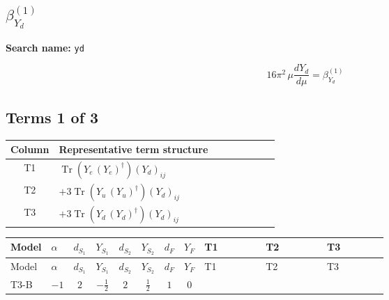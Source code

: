 \documentclass[8pt]{article}
\begin{document}
\begin{landscape}
\section*{$\beta_{Y_d}^{(1)}$}
\noindent\textbf{Search name: }\texttt{yd}\par\smallskip
\[16\pi^2\,\mu\frac{d Y_d}{d\mu}=\beta_{Y_d}^{(1)}\]
\subsection*{Terms 1 of 3}
\begin{center}
\begin{tabular}{@{}c >{\raggedright\arraybackslash}p{0.82\linewidth}@{}}
\toprule
Column & Representative term structure \\
\midrule
T1 & \(\displaystyle \operatorname{Tr}\!\left({Y_e}\,\left({Y_e}\right)^{\dagger}\right) \left({Y_d}\right)_{ij}\) \\
\midrule
T2 & \(\displaystyle +3 \operatorname{Tr}\!\left({Y_u}\,\left({Y_u}\right)^{\dagger}\right) \left({Y_d}\right)_{ij}\) \\
\midrule
T3 & \(\displaystyle +3 \operatorname{Tr}\!\left({Y_d}\,\left({Y_d}\right)^{\dagger}\right) \left({Y_d}\right)_{ij}\) \\
\midrule
\bottomrule
\end{tabular}
\end{center}
\smallskip
\tiny
\begin{longtable}{@{}llcccccc >{\raggedright\arraybackslash}p{0.21\linewidth} >{\raggedright\arraybackslash}p{0.21\linewidth} >{\raggedright\arraybackslash}p{0.21\linewidth}@{}}
\toprule
Model & $\alpha$ & $d_{S_1}$ & $Y_{S_1}$ & $d_{S_2}$ & $Y_{S_2}$ & $d_F$ & $Y_F$ & T1 & T2 & T3 \\
\midrule
\endfirsthead
\toprule
Model & $\alpha$ & $d_{S_1}$ & $Y_{S_1}$ & $d_{S_2}$ & $Y_{S_2}$ & $d_F$ & $Y_F$ & T1 & T2 & T3 \\
\midrule
\endhead
T3-B & $-1$ & $2$ & $-\frac{1}{2}$ & $2$ & $\frac{1}{2}$ & $1$ & $0$ & \scriptsize\adjustbox{max width=\linewidth}{$\begin{gathered} \operatorname{Tr}\!\left({Y_e}\,\left({Y_e}\right)^{\dagger}\right) \left({Y_d}\right)_{ij}\end{gathered}$} & \scriptsize\adjustbox{max width=\linewidth}{$\begin{gathered} +3 \operatorname{Tr}\!\left({Y_u}\,\left({Y_u}\right)^{\dagger}\right) \left({Y_d}\right)_{ij}\end{gathered}$} & \scriptsize\adjustbox{max width=\linewidth}{$\begin{gathered} +3 \operatorname{Tr}\!\left({Y_d}\,\left({Y_d}\right)^{\dagger}\right) \left({Y_d}\right)_{ij}\end{gathered}$} \\

\end{longtable}
\end{landscape}
\end{document}
